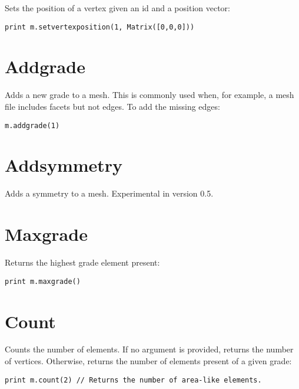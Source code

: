 Sets the position of a vertex given an id and a position vector:

\begin{lstlisting}
print m.setvertexposition(1, Matrix([0,0,0]))
\end{lstlisting}

\hypertarget{addgrade}{%
\section{Addgrade}\label{addgrade}}

Adds a new grade to a mesh. This is commonly used when, for example, a
mesh file includes facets but not edges. To add the missing edges:

\begin{lstlisting}
m.addgrade(1)
\end{lstlisting}

\hypertarget{addsymmetry}{%
\section{Addsymmetry}\label{addsymmetry}}

Adds a symmetry to a mesh. Experimental in version 0.5.

\hypertarget{maxgrade}{%
\section{Maxgrade}\label{maxgrade}}

Returns the highest grade element present:

\begin{lstlisting}
print m.maxgrade()
\end{lstlisting}

\hypertarget{count}{%
\section{Count}\label{count}}

Counts the number of elements. If no argument is provided, returns the
number of vertices. Otherwise, returns the number of elements present of
a given grade:

\begin{lstlisting}
print m.count(2) // Returns the number of area-like elements. 
\end{lstlisting}
